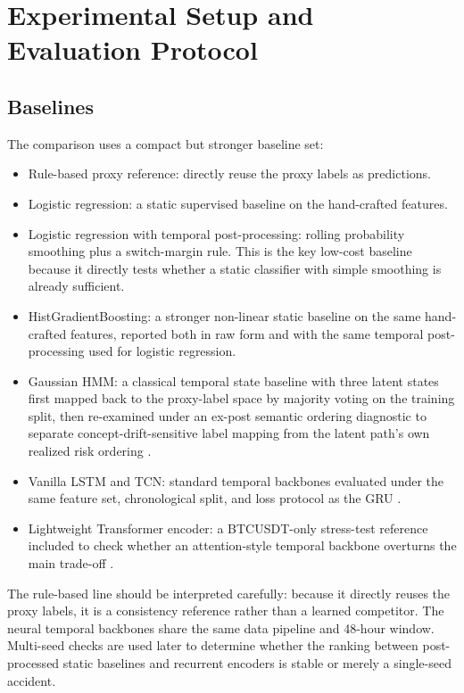\documentclass[a4paper,fleqn]{cas-dc}
\begin{document}
\section{Experimental Setup and Evaluation Protocol}
\subsection{Baselines}
The comparison uses a compact but stronger baseline set:
\begin{itemize}
\item Rule-based proxy reference: directly reuse the proxy labels as predictions.
\item Logistic regression: a static supervised baseline on the hand-crafted features.
\item Logistic regression with temporal post-processing: rolling probability smoothing plus a switch-margin rule. This is the key low-cost baseline because it directly tests whether a static classifier with simple smoothing is already sufficient.
\item HistGradientBoosting: a stronger non-linear static baseline on the same hand-crafted features, reported both in raw form and with the same temporal post-processing used for logistic regression.
\item Gaussian HMM: a classical temporal state baseline with three latent states first mapped back to the proxy-label space by majority voting on the training split, then re-examined under an ex-post semantic ordering diagnostic to separate concept-drift-sensitive label mapping from the latent path's own realized risk ordering \cite{hamilton1989nonstationary,rabiner1989hmm,oelschlager2023bullbear}.
\item Vanilla LSTM and TCN: standard temporal backbones evaluated under the same feature set, chronological split, and loss protocol as the GRU \cite{hochreiter1997lstm,cho2014gru,bai2018tcn}.
\item Lightweight Transformer encoder: a BTCUSDT-only stress-test reference included to check whether an attention-style temporal backbone overturns the main trade-off \cite{nie2023patchtst,liu2024itransformer}.
\end{itemize}

The rule-based line should be interpreted carefully: because it directly reuses the proxy labels, it is a consistency reference rather than a learned competitor. The neural temporal backbones share the same data pipeline and 48-hour window. Multi-seed checks are used later to determine whether the ranking between post-processed static baselines and recurrent encoders is stable or merely a single-seed accident.
\end{document}
